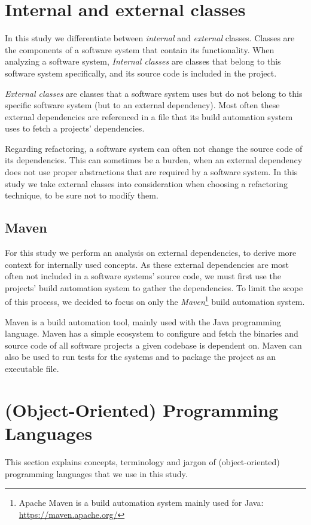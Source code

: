 \section{Internal and external classes}
In this study we differentiate between \textit{internal} and \textit{external} classes. Classes are the components of a software system that contain its functionality. When analyzing a software system, \textit{Internal classes} are classes that belong to this software system specifically, and its source code is included in the project.

\textit{External classes} are classes that a software system uses but do not belong to this specific software system (but to an external dependency). Most often these external dependencies are referenced in a file that its build automation system uses to fetch a projects' dependencies.

Regarding refactoring, a software system can often not change the source code of its dependencies. This can sometimes be a burden, when an external dependency does not use proper abstractions that are required by a software system. In this study we take external classes into consideration when choosing a refactoring technique, to be sure not to modify them.

\subsection{Maven}
For this study we perform an analysis on external dependencies, to derive more context for internally used concepts. As these external dependencies are most often not included in a software systems' source code, we must first use the projects' build automation system to gather the dependencies. To limit the scope of this process, we decided to focus on only the \textit{Maven}\footnote{Apache Maven is a build automation system mainly used for Java: \url{https://maven.apache.org/}} build automation system.

Maven is a build automation tool, mainly used with the Java programming language. Maven has a simple ecosystem to configure and fetch the binaries and source code of all software projects a given codebase is dependent on. Maven can also be used to run tests for the systems and to package the project as an executable file.

\section{(Object-Oriented) Programming Languages}
This section explains concepts, terminology and jargon of (object-oriented) programming languages that we use in this study.

